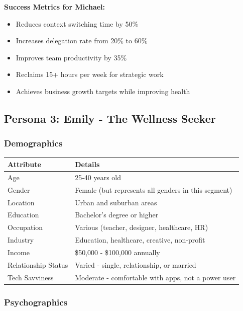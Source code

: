 \textbf{Success Metrics for Michael:}

\begin{itemize}
    \item Reduces context switching time by 50\%
    \item Increases delegation rate from 20\% to 60\%
    \item Improves team productivity by 35\%
    \item Reclaims 15+ hours per week for strategic work
    \item Achieves business growth targets while improving health
\end{itemize}

\subsection{Persona 3: Emily - The Wellness Seeker}

\subsubsection{Demographics}

\begin{table}[H]
\centering
\begin{tabular}{|l|p{10cm}|}
\hline
\rowcolor{lightgray}
\textbf{Attribute} & \textbf{Details} \\
\hline
Age & 25-40 years old \\
\hline
Gender & Female (but represents all genders in this segment) \\
\hline
Location & Urban and suburban areas \\
\hline
Education & Bachelor's degree or higher \\
\hline
Occupation & Various (teacher, designer, healthcare, HR) \\
\hline
Industry & Education, healthcare, creative, non-profit \\
\hline
Income & \$50,000 - \$100,000 annually \\
\hline
Relationship Status & Varied - single, relationship, or married \\
\hline
Tech Savviness & Moderate - comfortable with apps, not a power user \\
\hline
\end{tabular}
\end{table}

\subsubsection{Psychographics}

